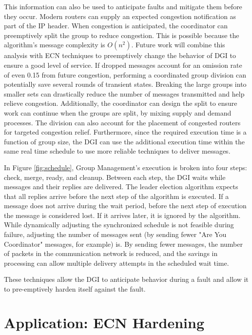 This information can also be used to anticipate faults and mitigate them before they occur.
Modern routers can supply an expected congestion notification as part of the IP header\cite{ECN2}.
When congestion is anticipated, the coordinator can preemptively split the group to reduce congestion.
This is possible because the algorithm's message complexity is $O(n^2)$.
Future work will combine this analysis with ECN techniques to preemptively change the behavior of DGI to ensure a good level of service.
If dropped messages account for an omission rate of even 0.15 from future congestion, performing a coordinated group division can potentially save several rounds of transient states.
Breaking the large groups into smaller sets can drastically reduce the number of messages transmitted and help relieve congestion.
Additionally, the coordinator can design the split to ensure work can continue when the groups are split, by mixing supply and demand processes.
The division can also account for the placement of congested routers for targeted congestion relief.
Furthermore, since the required execution time is a function of group size, the DGI can use the additional execution time within the same real time schedule to use more reliable techniques to deliver messages.


In Figure \ref{fig:schedule}, Group Management's execution is broken into four steps: check, merge, ready, and cleanup.
Between each step, the DGI waits while messages and their replies are delivered.
The leader election algorithm expects that all replies arrive before the next step of the algorithm is executed.
If a message does not arrive during the wait period, before the next step of execution the message is considered lost.
If it arrives later, it is ignored by the algorithm.
While dynamically adjusting the synchronized schedule is not feasible during failure, adjusting the number of messages sent (by sending fewer "Are You Coordinator" messages, for example) is.
By sending fewer messages, the number of packets in the communication network is reduced, and the savings in processing can allow multiple delivery attempts in the scheduled wait time.

These techniques allow the DGI to anticipate behavior during a fault and allow it to pre-emptively harden itself against the fault.

\section{Application: ECN Hardening}


